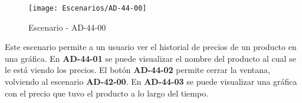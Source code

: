 \begin{figure}[H]
\centering
\texttt{[image: Escenarios/AD-44-00]}
\caption{Escenario - AD-44-00}
\label{fig:AD-44-00}
\end{figure}

Este escenario permite a un usuario ver el historial de precios de un producto en una gráfica. En \textbf{AD-44-01} se puede visualizar el nombre del producto al cual se le está viendo los precios. El botón \textbf{AD-44-02} permite cerrar la ventana, volviendo al escenario \textbf{AD-42-00}. En \textbf{AD-44-03} se puede visualizar una gráfica con el precio que tuvo el producto a lo largo del tiempo.
\clearpage
